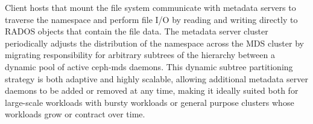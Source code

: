 Client hosts that mount the file system communicate with metadata
servers to traverse the namespace and perform file I/O by reading and writing
directly to RADOS objects that contain the file data.  The metadata server
cluster periodically adjusts
the distribution of the namespace across the MDS cluster by migrating
responsibility for arbitrary subtrees of the hierarchy between a dynamic pool
of active ceph-mds daemons.  This dynamic subtree
partitioning~\cite{Weil:2004:dynamic} strategy is both adaptive and highly
scalable, allowing additional metadata server daemons to be added or removed
at any time, making it ideally suited both for large-scale workloads with
bursty workloads or general purpose clusters whose workloads grow or contract
over time.

\begin{comment}
In comparison to other parallel file
systems, Ceph has a number of distinctive features:

\begin{itemize}
 
\item Ceph has an intelligent and powerful data placement mechanism, known as
  CRUSH. The CRUSH algorithm allows a client to pre-calculate object
  placement and layout while taking into consideration of failure domains and
  hierarchical storage tiers.
  
  \item From the start, Ceph's design anticipated managing meta data and the
  name space with a cluster of meta data servers. It utilized a dynamic subtree
  partitioning strategy to continuously adapt meta data distribution to current
  demands.

  \item Ceph's design assumes that the system is composed of unreliable
  components; fault-detection and fault-tolerance (e.g., replication) are the
  norm rather than the exception. This is in line with the expectations and
  future directions of Exascale computing.

  \item Ceph is built on top of a unified object management layer, RADOS. Both
  meta data and the file data can take advantage of this uniformity. On top of
  RADOS, Ceph build and project a host of other features such as RESTful
  interface, S3 and Swift-compliant API, cloud integration.

  \item Most of the Ceph processes reside in user-space. Generally speaking,
this makes the system easier to debug and maintain. The client-side support has
long been integrated into Linux mainline kernel, which eases the deployment and
out-of-box experience.

\end{itemize}
\end{comment}

